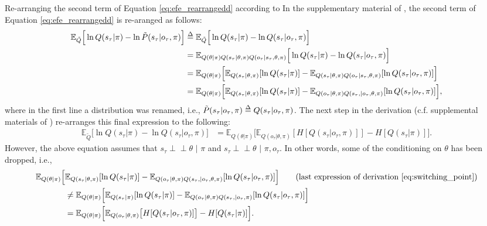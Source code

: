 \documentclass[twoside,11pt]{article}
\makeatletter
\def\delequal{\mathrel{\ensurestackMath{\stackon[1pt]{=}{\scriptstyle\Delta}}}}
\newcommand{\indep}{\perp \! \! \! \perp}
\newcounter{subsubsubsection}[subsubsection]
\def\subsubsubsection{\@startsection
     {subsubsubsection}{4}{\z@} {-3.25ex plus -1
     ex minus -.2ex}{1.5ex plus .2ex}{\normalsize\bf}}
\makeatother
\begin{document}
\subsubsubsection{Re-arranging the second term of Equation \eqref{eq:efe_rearrangedd} according to \citet{DeepAIwithMCMC}}
In the supplementary material of \citep{DeepAIwithMCMC}, the second term of Equation \eqref{eq:efe_rearrangedd} is re-aranged as follows:
\begin{align}
\mathbb{E}_{\tilde{Q}}\Big[ \ln Q(s_\tau|\pi) - \ln \tilde{P}(s_\tau|o_\tau, \pi) \Big] &\delequal \mathbb{E}_{\tilde{Q}}\Big[ \ln Q(s_\tau|\pi) - \ln Q(s_\tau|o_\tau, \pi) \Big]\label{eq:switching_point}\\
&= \mathbb{E}_{Q(\theta|\pi)Q(s_\tau|\theta,\pi)Q(o_\tau|s_\tau,\theta,\pi)}\Big[ \ln Q(s_\tau|\pi) - \ln Q(s_\tau|o_\tau, \pi) \Big]\nonumber\\
&= \mathbb{E}_{Q(\theta|\pi)}\Big[ \mathbb{E}_{Q(s_\tau|\theta,\pi)}[\ln Q(s_\tau|\pi)] - \mathbb{E}_{Q(s_\tau|\theta,\pi)Q(o_\tau|s_\tau,\theta,\pi)}[\ln Q(s_\tau|o_\tau, \pi)] \Big]\nonumber\\
&= \mathbb{E}_{Q(\theta|\pi)}\Big[ \mathbb{E}_{Q(s_\tau|\theta,\pi)}[\ln Q(s_\tau|\pi)] - \mathbb{E}_{Q(o_\tau|\theta,\pi)Q(s_\tau,|o_\tau,\theta,\pi)}[\ln Q(s_\tau|o_\tau, \pi)] \Big],\nonumber
\end{align}
where in the first line a distribution was renamed, i.e., $\tilde{P}(s_\tau|o_\tau, \pi) \delequal Q(s_\tau|o_\tau, \pi)$. The next step in the derivation (c.f. supplemental materials of \citet{DeepAIwithMCMC}) re-arranges this final expression to the following:
\begin{align*}
\mathbb{E}_{\tilde{Q}}\Big[ \ln Q(s_\tau|\pi) - \ln Q(s_\tau|o_\tau, \pi) \Big] &= \mathbb{E}_{Q(\theta|\pi)}\Big[ \mathbb{E}_{Q(o_\tau|\theta,\pi)}[H[Q(s_\tau|o_\tau, \pi)]] - H[Q(s_\tau|\pi)] \Big].
\end{align*}
However, the above equation assumes that $s_\tau \indep \theta\,\, | \,\,\pi$ and $s_\tau \indep \theta \,\,| \,\,\pi, o_\tau$. In other words, some of the conditioning on $\theta$ has been dropped, i.e.,
\begin{align*}
\mathbb{E}_{Q(\theta|\pi)}\Big[ &\mathbb{E}_{Q(s_\tau|\theta,\pi)}[\ln Q(s_\tau|\pi)] - \mathbb{E}_{Q(o_\tau|\theta,\pi)Q(s_\tau,|o_\tau,\theta,\pi)}[\ln Q(s_\tau|o_\tau, \pi)] \Big] \tag{last expression of derivation \ref{eq:switching_point}}\\
&\neq \mathbb{E}_{Q(\theta|\pi)}\Big[ \mathbb{E}_{Q(s_\tau|\pi)}[\ln Q(s_\tau|\pi)] - \mathbb{E}_{Q(o_\tau|\theta,\pi)Q(s_\tau,|o_\tau,\pi)}[\ln Q(s_\tau|o_\tau, \pi)] \Big] \\
&= \mathbb{E}_{Q(\theta|\pi)}\Big[ \mathbb{E}_{Q(o_\tau|\theta,\pi)}\big[H[Q(s_\tau|o_\tau, \pi)]\big] - H[Q(s_\tau|\pi)] \Big].
\end{align*}
\end{document}
